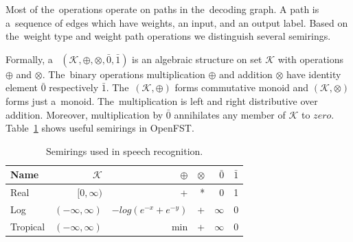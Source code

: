 Most of the~operations operate on paths in the~decoding graph.
A path is a~sequence of edges which have weights, an input, and an output label.
Based on the~weight type and weight path operations we distinguish several semirings. 

Formally, a~ $(\mathcal{K}, \oplus, \otimes, \bar{0}, \bar{1})$ is an algebraic structure on set $\mathcal{K}$ with operations $\oplus$ and $\otimes$.
The~binary operations multiplication $\oplus$ and addition $\otimes$ have identity element $\bar{0}$ respectively $\bar{1}$. 
The~$(\mathcal{K}, \oplus)$ forms commutative monoid and $(\mathcal{K}, \otimes)$ forms just a~monoid.
The~multiplication is left and right distributive over addition.
Moreover, multiplication by $\bar{0}$ annihilates any member of $\mathcal{K}$ to $zero$. 
Table~\ref{tab:semiring} shows useful semirings in OpenFST.

\begin{table}[!htp]\label{tab:semiring}
\begin{center}
\begin{tabular}{lrrrrr}
\hline
Name & $\mathcal{K}$ & $\oplus$ & $ \otimes$ & $\bar{0}$ & $\bar{1}$ \\ 
\hline
Real        & $[0,\infty)$        &  +                     &  * &  0        &  1  \\
Log         & $(-\infty, \infty)$ & $-log(e^{-x} + e^{-y})$ & + &  $\infty$ &  0  \\
Tropical    & $(-\infty, \infty)$ &  min                   &  + &  $\infty$ &  0  \\
\hline
\end{tabular}
\caption{Semirings used in speech recognition.\cite{openfst_web}}
\end{center}
\end{table}
